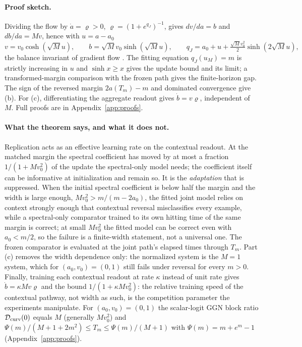 \paragraph{Proof sketch.}
Dividing the flow by $\dot a=\varrho>0$, $\varrho=(1+e^{q_J})^{-1}$,
gives $dv/da=b$ and $db/da=Mv$, hence with $u=a-a_0$
\[
 v=v_0\cosh(\sqrt M u),\qquad
 b=\sqrt M v_0\sinh(\sqrt M u),\qquad
 q_J=a_0+u+\tfrac{\sqrt M v_0^2}{2}\sinh(2\sqrt M u),
\]
the balance invariant of gradient flow \citep{astra_du2018balance}. The
fitting equation $q_J(u_M)=m$ is strictly increasing in $u$ and
$\sinh x\ge x$ gives the update bound and its limit; a transformed-margin
comparison with the frozen path gives the finite-horizon gap. The sign of
the reversed margin $2a(T_m)-m$ and dominated convergence give (b). For
(c), differentiating the aggregate readout gives $\dot b=v\varrho$,
independent of $M$. Full proofs are in Appendix~\ref{app:proofs}.

\paragraph{What the theorem says, and what it does not.}
Replication acts as an effective learning rate on the contextual readout.
At the matched margin the spectral coefficient has moved by at most a
fraction $1/(1+Mv_0^2)$ of the update the spectral-only model needs; the
coefficient itself can be informative at initialization and remain so. It
is the \emph{adaptation} that is suppressed. When the initial spectral
coefficient is below half the margin and the width is large enough,
$Mv_0^2>m/(m-2a_0)$, the fitted joint model relies on context strongly
enough that contextual reversal misclassifies every example, while a
spectral-only comparator trained to its own hitting time of the same
margin is correct; at small $Mv_0^2$ the fitted model can be correct even
with $a_0<m/2$, so the failure is a finite-width statement, not a
universal one. The frozen comparator is evaluated at the joint path's
elapsed times through $T_m$. Part (c) removes the width dependence
only: the normalized system is the $M=1$ system, which for
$(a_0,v_0)=(0,1)$ still fails under reversal for every $m>0$. Finally,
training each contextual readout at rate $\kappa$ instead of unit rate
gives $\dot b=\kappa Mv\varrho$ and the bound $1/(1+\kappa Mv_0^2)$: the
relative training speed of the contextual pathway, not width as such, is
the competition parameter the experiments manipulate. For
$(a_0,v_0)=(0,1)$ the scalar-logit GGN block ratio
$\mathcal D_{\rm curv}(0)$ equals $M$ (generally $Mv_0^2$) and
$\Psi(m)/(M+1+2m^2)\le T_m\le\Psi(m)/(M+1)$ with $\Psi(m)=m+e^m-1$
(Appendix~\ref{app:proofs}).

